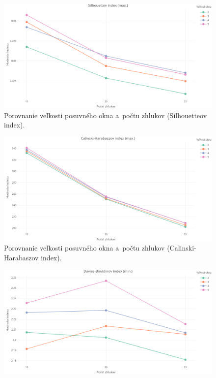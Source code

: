 \documentclass[a4paper,twoside,slovak,12pt,appendix]{article}
\begin{document}
\begin{appendices}
\begin{figure}[htbp]
  \centering
  \includegraphics[width=\textwidth]{cvi/dtw_basic_workdays_sparse/201902271850-Sil-dtw_basic_workdays_sparse.png}
  \caption{Porovnanie veľkosti posuvného okna a~počtu zhlukov (Silhouetteov index).}
\end{figure}
\begin{figure}[htbp]
  \centering
  \includegraphics[width=\textwidth]{cvi/dtw_basic_workdays_sparse/201902271850-CH-dtw_basic_workdays_sparse.png}
  \caption{Porovnanie veľkosti posuvného okna a~počtu zhlukov (Calinski-Harabaszov index).}
\end{figure}
\begin{figure}[htbp]
  \centering
  \includegraphics[width=\textwidth]{cvi/dtw_basic_workdays_sparse/201902271850-DB-dtw_basic_workdays_sparse.png}

\end{figure}
\end{appendices}
\end{document}
